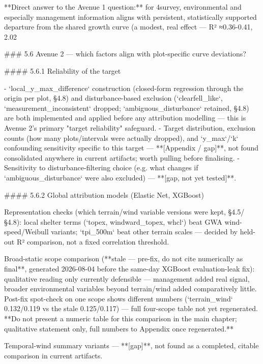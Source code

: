 **Direct answer to the Avenue 1 question:** for 4survey, environmental and especially management information aligns with persistent, statistically supported departure from the shared growth curve (a modest, real effect — R² ≈0.36-0.41, 2.02%

### 5.6 Avenue 2 — which factors align with plot-specific curve deviations?

#### 5.6.1 Reliability of the target

- `local_y_max_difference` construction (closed-form regression through the origin per plot, §4.8) and disturbance-based exclusion (`clearfell_like`, `measurement_inconsistent` dropped; `ambiguous_disturbance` retained, §4.8) are both implemented and applied before any attribution modelling — this is Avenue 2's primary "target reliability" safeguard.
- Target distribution, exclusion counts (how many plots/intervals were actually dropped), and `y_max`/`k` confounding sensitivity specific to this target — **[Appendix / gap]**, not found consolidated anywhere in current artifacts; worth pulling before finalising.
- Sensitivity to disturbance-filtering choice (e.g. what changes if `ambiguous_disturbance` were also excluded) — **[gap, not yet tested]**.

#### 5.6.2 Global attribution models (Elastic Net, XGBoost)

Representation checks (which terrain/wind variable versions were kept, §4.5/§4.8): local shelter terms (`topex, windward_topex, whcl`) beat GWA wind-speed/Weibull variants; `tpi_500m` beat other terrain scales — decided by held-out R² comparison, not a fixed correlation threshold.

Broad-static scope comparison (**stale — pre-fix, do not cite numerically as final**, generated 2026-08-04 before the same-day XGBoost evaluation-leak fix): qualitative reading only currently defensible — management added real signal, broader environmental variables beyond terrain/wind added comparatively little. Post-fix spot-check on one scope shows different numbers (`terrain_wind` 0.132/0.119 vs the stale 0.125/0.117) — full four-scope table not yet regenerated. **Do not present a numeric table for this comparison in the main chapter; qualitative statement only, full numbers to Appendix once regenerated.**

Temporal-wind summary variants — **[gap]**, not found as a completed, citable comparison in current artifacts.


